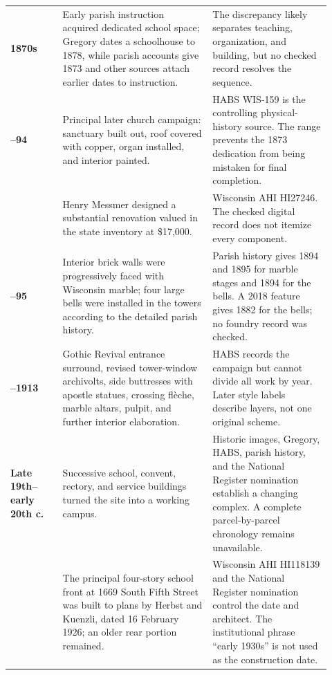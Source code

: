 \begin{longtable}{>{\bfseries\RaggedRight\arraybackslash}p{0.15\linewidth}>{\RaggedRight\arraybackslash}p{0.43\linewidth}>{\RaggedRight\arraybackslash}p{0.34\linewidth}}
1870s & Early parish instruction acquired dedicated school space; Gregory dates a schoolhouse to 1878, while parish accounts give 1873 and other sources attach earlier dates to instruction. & The discrepancy likely separates teaching, organization, and building, but no checked record resolves the sequence.\\

1884--94 & Principal later church campaign: sanctuary built out, roof covered with copper, organ installed, and interior painted. & HABS WIS-159 is the controlling physical-history source. The range prevents the 1873 dedication from being mistaken for final completion.\\

1885 & Henry Messmer designed a substantial renovation valued in the state inventory at \$17,000. & Wisconsin AHI HI27246. The checked digital record does not itemize every component.\\

1894--95 & Interior brick walls were progressively faced with Wisconsin marble; four large bells were installed in the towers according to the detailed parish history. & Parish history gives 1894 and 1895 for marble stages and 1894 for the bells. A 2018 feature gives 1882 for the bells; no foundry record was checked.\\

1895--1913 & Gothic Revival entrance surround, revised tower-window archivolts, side buttresses with apostle statues, crossing flèche, marble altars, pulpit, and further interior elaboration. & HABS records the campaign but cannot divide all work by year. Later style labels describe layers, not one original scheme.\\

Late 19th--early 20th c. & Successive school, convent, rectory, and service buildings turned the site into a working campus. & Historic images, Gregory, HABS, parish history, and the National Register nomination establish a changing complex. A complete parcel-by-parcel chronology remains unavailable.\\

1926 & The principal four-story school front at 1669 South Fifth Street was built to plans by Herbst and Kuenzli, dated 16 February 1926; an older rear portion remained. & Wisconsin AHI HI118139 and the National Register nomination control the date and architect. The institutional phrase ``early 1930s'' is not used as the construction date.\\


\end{longtable}
